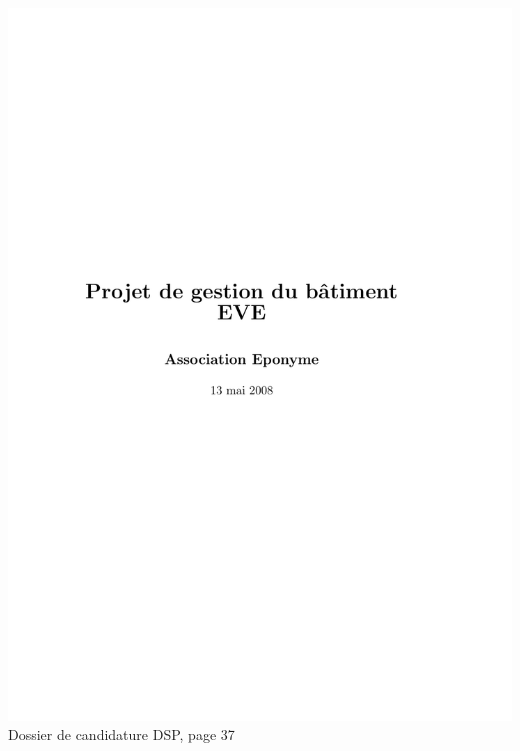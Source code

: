 \includegraphics[scale=0.85,trim=20mm 20mm 20mm 20mm,clip,page=37]{annexes/candidature_dsp.pdf} \\
Dossier de candidature DSP, page 37
\newpage
